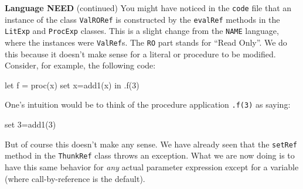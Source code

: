 \begin{minipage}[t]{\sw}
\slidenumber
\LARGE
{\bf Language NEED} (continued)\exx
You might have noticed in the \verb'code' file that an instance
of the class \verb'ValRORef' is constructed
by the \verb'evalRef' methods
in the \verb'LitExp' and \verb'ProcExp' classes.
This is a slight change from the \verb'NAME' language,
where the instances were \verb'ValRef's.
The \verb'RO' part stands for ``Read Only''.
We do this because it doesn't make sense
for a literal or procedure to be modified.\exx
Consider, for example, the following code:
{\Large
\begin{qv}
let
  f = proc(x) set x=add1(x)
in
  .f(3)
\end{qv}
}
One's intuition would be to think
of the procedure application \verb'.f(3)' as saying:
{\Large
\begin{qv}
set 3=add1(3)
\end{qv}
}
But of course this doesn't make any sense.\exx
We have already seen that the \verb'setRef' method
in the \verb'ThunkRef' class throws an exception.
What we are now doing is to have this same behavior
for {\em any} actual parameter expression
except for a variable (where call-by-reference is the default).
\end{minipage}
\clearpage
